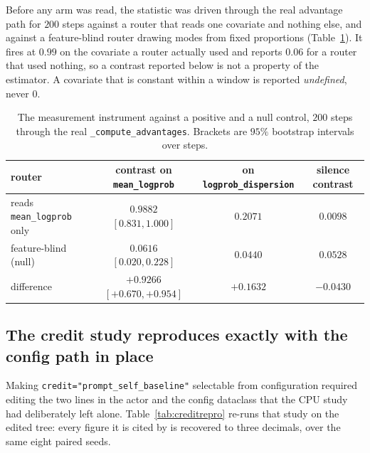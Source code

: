 Before any arm was read, the statistic was driven through the real advantage path for $200$ steps
against a router that reads one covariate and nothing else, and against a feature-blind router
drawing modes from fixed proportions (Table~\ref{tab:instrument}). It fires at $0.99$ on the
covariate a router actually used and reports $0.06$ for a router that used nothing, so a contrast
reported below is not a property of the estimator. A covariate that is constant within a window
is reported \emph{undefined}, never $0$.

\begin{table}[t]
\centering\small
\caption{The measurement instrument against a positive and a null control, $200$ steps through
the real \texttt{\_compute\_advantages}. Brackets are $95\%$ bootstrap intervals over steps.}
\label{tab:instrument}
\begin{tabular}{lccc}
\toprule
router & contrast on \texttt{mean\_logprob} & on \texttt{logprob\_dispersion} & silence contrast \\
\midrule
reads \texttt{mean\_logprob} only & $0.9882$ $[0.831, 1.000]$ & $0.2071$ & $0.0098$ \\
feature-blind (null)              & $0.0616$ $[0.020, 0.228]$ & $0.0440$ & $0.0528$ \\
\midrule
difference                        & $\mathbf{+0.9266}$ $[+0.670, +0.954]$ & $+0.1632$ & $-0.0430$ \\
\bottomrule
\end{tabular}
\end{table}

\subsection{The credit study reproduces exactly with the config path in place}
\label{sec:creditrepro}

Making \texttt{credit="prompt\_self\_baseline"} selectable from configuration required editing
the two lines in the actor and the config dataclass that the CPU study had deliberately left
alone. Table~\ref{tab:creditrepro} re-runs that study on the edited tree: every figure it is
cited by is recovered to three decimals, over the same eight paired seeds.

